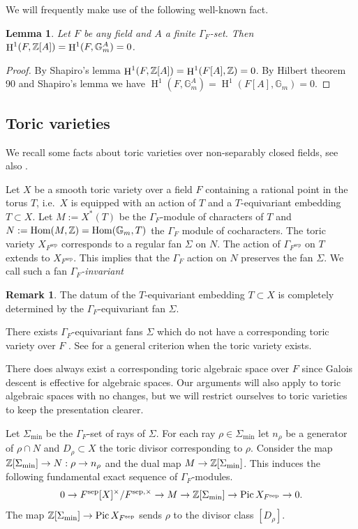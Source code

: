 \documentclass[a4paper,11pt,reqno]{amsart}
\newcommand{\G}{\mathbb{G}}
\DeclareMathOperator{\Hom}{Hom}
\DeclareMathOperator{\Pic}{Pic}
\DeclareMathOperator{\HH}{H}
\DeclareMathOperator{\sep}{sep}
\newtheorem{lemma}[theorem]{Lemma}
\theoremstyle{definition}
\newtheorem{remark}[theorem]{Remark}
\begin{document}
We will frequently make use of the following well-known fact.
\begin{lemma}\label{lem: Shapiro's lemma}
	Let $F$ be any field and $A$ a finite $\Gamma_F$-set. Then $\HH^1(F, \Z[A]) = \HH^1(F, \G_m^A) = 0$.
\end{lemma}
\begin{proof}
	By Shapiro's lemma $\HH^1(F, \Z[A]) = \HH^1(F[A], \Z) = 0$. By Hilbert theorem 90 and Shapiro's lemma we have $\HH^1(F, \G_m^A) = \HH^1(F[A], \G_m) = 0$.
\end{proof}

\subsection{Toric varieties}
We recall some facts about toric varieties over non-separably closed fields, see also \cite[\S1]{Batyrev1995Rational}.
 
Let $X$ be a smooth toric variety over a field $F$ containing a rational point in the torus $T$, i.e.~$X$ is equipped with an action of $T$ and a $T$-equivariant embedding $T \subset X$. Let $M := X^*(T)$ be the $\Gamma_F$-module of characters of $T$ and $N := \Hom(M, \Z) = \Hom(\G_m, T)$ the $\Gamma_F$ module of cocharacters. The toric variety $X_{F^{\sep}}$ corresponds to a regular fan $\Sigma$ on $N$. The action of $\Gamma_{F^{\sep}}$ on $T$ extends to $X_{F^{\sep}}$. This implies that the $\Gamma_F$ action on $N$ preserves the fan $\Sigma$. We call such a fan \emph{$\Gamma_F$-invariant}
\begin{remark}
	The datum of the $T$-equivariant embedding $T \subset X$ is completely determined by the $\Gamma_F$-equivariant fan $\Sigma$. 
	
	There exists $\Gamma_F$-equivariant fans $\Sigma$ which do not have a corresponding toric variety over $F$ \cite[Thm. 1.31]{Hurugen2011Toric}. See \cite[Thm. 1.22]{Hurugen2011Toric} for a general criterion when the toric variety exists.
	
	There does always exist a corresponding toric algebraic space over $F$ since Galois descent is effective for algebraic spaces. Our arguments will also apply to toric algebraic spaces with no changes, but we will restrict ourselves to toric varieties to keep the presentation clearer.
\end{remark}

Let $\Sigma_{\min}$ be the $\Gamma_F$-set of rays of $\Sigma$. For each ray $\rho \in \Sigma_{\min}$ let $n_{\rho}$ be a generator of $\rho \cap N$ and $D_{\rho} \subset X$ the toric divisor corresponding to $\rho$. Consider the map $\mathbb{Z}[\Sigma_{\min}] \to N: \rho \to n_{\rho}$ and the dual map $M \to \mathbb{Z}[\Sigma_{\min}]$. This induces the following fundamental exact sequence of $\Gamma_F$-modules.
\begin{equation}\label{eq:Exact sequence invertible global sections and Picard group}
	0 \to F^{\sep}[X]^{\times}/F^{\sep, \times}\to M \to \Z[\Sigma_{\min}] \to \Pic X_{F^{\sep}} \to 0.
\end{equation}
The map $ \Z[\Sigma_{\min}] \to \Pic X_{F^{\sep}}$ sends $\rho$ to the divisor class $[D_{\rho}]$.
\end{document}

